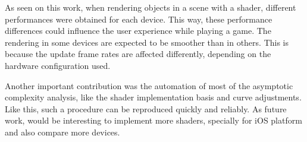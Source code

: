 \documentclass[10pt, conference, compsocconf]{IEEEtran}
\begin{document}
As seen on this work, when rendering objects in a scene with a shader, different performances were obtained for each device. 
This way, these performance differences could influence the user experience while playing a game. 
The rendering in some devices are expected to be smoother than in others. 
This is because the update frame rates are affected differently, depending on the hardware configuration used.

Another important contribution was the automation of most of the asymptotic
complexity analysis, like the shader implementation basis and curve adjustments.
Like this, such a procedure can be reproduced quickly and reliably. As future work, would be 
interesting to implement more shaders, specially for iOS platform and also compare more devices. 








%
%



%
%
\end{document}
